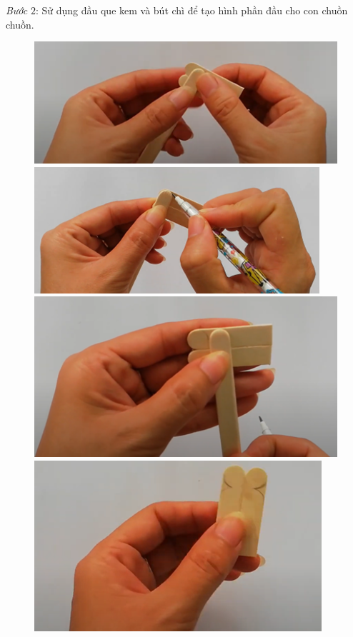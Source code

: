 \begin{multicols}{2}
\begin{figure}[H]
		\vspace*{-10pt}
	\end{figure}
	\textit{Bước} $2$: Sử dụng đầu que kem và bút chì để tạo hình phần đầu cho con chuồn chuồn.
	\begin{figure}[H]
		\vspace*{-5pt}
		\centering
		\captionsetup{labelformat= empty, justification=centering}
		\includegraphics[width= 1\linewidth]{14}
		\includegraphics[width= 1\linewidth]{15}
		\includegraphics[width= 1\linewidth]{16}
		\includegraphics[width= 1\linewidth]{17}

\end{figure}
\end{multicols}
